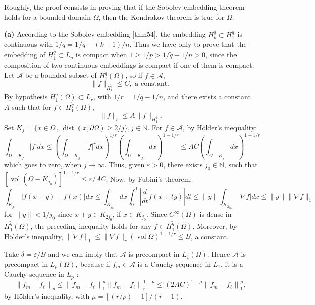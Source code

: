 \documentclass[12pt,hyperref,a4paper,UTF8]{ctexart}
\begin{document}
\vskip -23pt
\begin{Proof}
Roughly, the proof consists in proving that if the Sobolev embedding theorem holds for a bounded domain $\Omega$, then the Kondrakov theorem is true for $\Omega$.

\vskip 10pt
\textbf{(a)} According to the Sobolev embedding \autoref{thm54}, the embedding $H_k^q \subset H_1^{\tilde{q}}$ is continuous with $1 / \tilde{q}=1 / q-(k-1) / n$. Thus we have only to
prove that the embedding of $H_1^{\tilde{q}} \subset L_p$ is compact when $1 \geq 1 / p>1 / \tilde{q}-1 / n>0$, since the composition of two continuous embeddings is compact if one of them is compact.
Let $\mathcal{A}$ be a bounded subset of $H_1^{\tilde{q}}(\Omega)$, so if $f \in \mathcal{A}$,
$$
\|f\|_{H^{\tilde{q}}_1} \leq C, \text { a constant. }
$$
By hypothesis $H_1^{\tilde{q}}(\Omega) \subset L_r$, with $1 / r=1 / \tilde{q}-1 / n$, and there exists a constant $A$ such that for $f \in H_1^{\tilde{q}}(\Omega)$,
$$
\|f\|_r \leq A\|f\|_{H_1^{\bar{q}}} .
$$
Set $K_j=\{x \in \Omega \,,\, \operatorname{dist}(x, \partial \Omega) \geq 2 / j\}, j \in \mathbb{N}$. For $f \in \mathcal{A}$, by Hölder's inequality:
$$
\int_{\Omega-K_j}|f| d x \leq\left(\int_{\Omega-K_j}|f|^r d x\right)^{1 / r}\left(\int_{\Omega-K_j} d x\right)^{1-1 / r} \leq A C\left(\int_{\Omega-K_j} d x\right)^{1-1 / r}
$$
which goes to zero, when $j \rightarrow \infty$. Thus, given $\varepsilon>0$, there exists $j_0 \in \mathbb{N}$, such that $\left[\operatorname{vol}\left(\Omega-K_{j_0}\right)\right]^{1-1 / r} \leq \varepsilon / A C$. Now, by Fubini's theorem:
$$
\int_{K_{j_0}}|f(x+y)-f(x)| d x  \leq \int_{K_{j_0}} d x \int_0^1\left|\frac{d}{d t} f(x+t y)\right| d t \leq\|y\| \int_{K_{2 j_0}}|\nabla f| d x \leq\|y\|\|\nabla f\|_1
$$
for $\|y\|<1 / j_0$ since $x+y \in K_{2j_0}$, if $x \in K_{j_0}$. Since $C^{\infty}(\Omega)$ is dense in $H_1^{\tilde{q}}(\Omega)$, the preceding inequality holds for any $f \in H_1^{\tilde{q}}(\Omega)$. Moreover, by Hölder's inequality, $\|\nabla f\|_1 \leq\|\nabla f\|_r(\operatorname{vol} \Omega)^{1-1 / r} \leq B$, a constant.

\vskip  3pt
\noindent
Take $\delta=\varepsilon / B$ and we can imply that $\mathcal{A}$ is precompact in $L_1(\Omega)$. Hence $\mathcal{A}$ is precompact in $L_p(\Omega)$, because if $f_m \in \mathcal{A}$ is a Cauchy sequence in $L_1$, it is a Cauchy sequence in $L_p$ :
$$
\left\|f_m-f_{\ell}\right\|_p \leq\left\|f_m-f_{\ell}\right\|_1^\mu\left\|f_m-f_{\ell}\right\|_r^{1-\mu} \leq(2 A C)^{1-\mu}\left\|f_m-f_{\ell}\right\|_1^\mu,
$$
by Hölder's inequality, with $\mu=[(r / p)-1] /(r-1)$.


\end{Proof}
\end{document}
